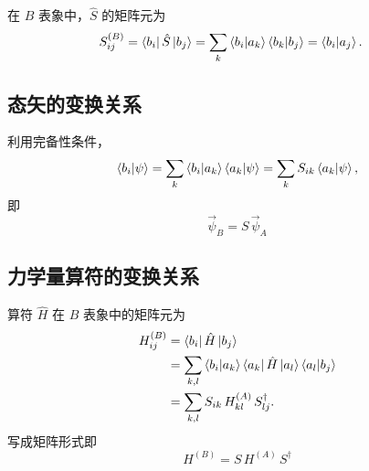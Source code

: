 \documentclass[12pt,a4paper]{article}
\begin{document}
在 $B$ 表象中，$\hat{S}$ 的矩阵元为
\begin{align*}
S_{ij}^{(B)}&=\bra{b_i}\hat{S}\ket{b_j}
=\sum_k\braket{b_i|a_k}\braket{b_k|b_j}
=\braket{b_i|a_j}.
\end{align*}

\subsection{态矢的变换关系}

利用完备性条件，
\[
\braket{b_i|\psi}=\sum_k\braket{b_i|a_k}\braket{a_k|\psi}
=\sum_k S_{ik}\braket{a_k|\psi},
\]
即
\[
\boxed{\;\vec{\psi}_B=S\,\vec{\psi}_A\;}
\]

\subsection{力学量算符的变换关系}

算符 $\hat{H}$ 在 $B$ 表象中的矩阵元为
\begin{align*}
H_{ij}^{(B)}&=\bra{b_i}\hat{H}\ket{b_j}\\
&=\sum_{k,l}\braket{b_i|a_k}\bra{a_k}\hat{H}\ket{a_l}\braket{a_l|b_j}\\
&=\sum_{k,l}S_{ik}\,H_{kl}^{(A)}\,S_{lj}^{\dagger}.
\end{align*}
写成矩阵形式即
\[
\boxed{\;H^{(B)}=S\,H^{(A)}\,S^{\dagger}\;}
\]
\end{document}
